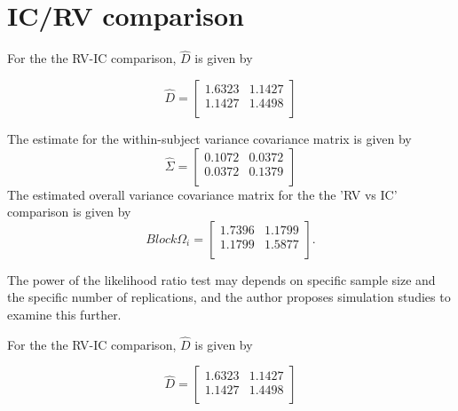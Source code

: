 \documentclass[12pt, a4paper]{report}
\theoremstyle{plain}
\theoremstyle{definition}
\theoremstyle{remark}
\begin{document}
	\section{IC/RV comparison}
	
	
	
	For the the RV-IC comparison, $\hat{D}$ is given by
	
	
	\begin{equation}
	\hat{D}= \left[ \begin{array}{cc}
	1.6323 & 1.1427  \\
	1.1427 & 1.4498 \\
	\end{array} \right]
	\end{equation}
	
	The estimate for the within-subject variance covariance matrix is
	given by
	\begin{equation}
	\hat{\Sigma}= \left[ \begin{array}{cc}
	0.1072 & 0.0372  \\
	0.0372 & 0.1379  \\
	\end{array}\right]
	\end{equation}
	The estimated overall variance covariance matrix for the the 'RV
	vs IC' comparison is given by
	\begin{equation}
	Block \Omega_{i}= \left[ \begin{array}{cc}
	1.7396 & 1.1799  \\
	1.1799 & 1.5877  \\
	\end{array} \right].
	\end{equation}
	
	The power of the
	likelihood ratio test may depends on specific sample size and the
	specific number of  replications, and the author proposes
	simulation studies to examine this further.
	
	\newpage
	For the the RV-IC comparison, $\hat{D}$ is given by
	
	
	\begin{equation}
	\hat{D}= \left[ \begin{array}{cc}
	1.6323 & 1.1427  \\
	1.1427 & 1.4498 \\
	\end{array} \right]
	\end{equation}
	
\end{document}
